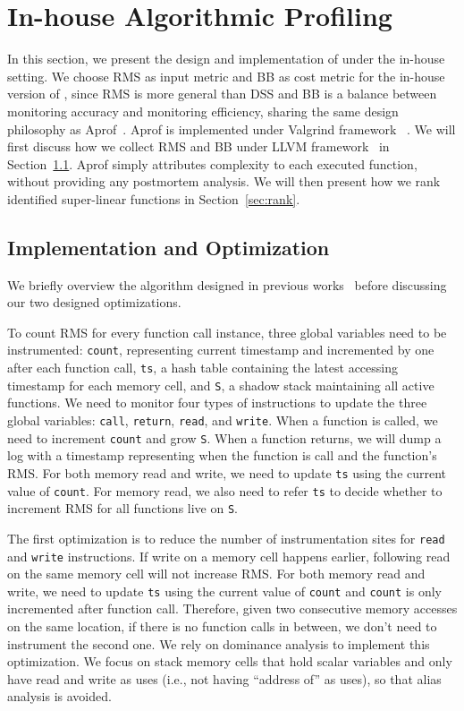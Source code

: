 \section{In-house Algorithmic Profiling}
\label{sec:in-house}

In this section, we present the design and implementation 
of \Tool under the in-house setting. 
We choose RMS as input metric and BB as cost 
metric for the in-house version of \Tool, 
since RMS is more general than DSS and BB is a balance 
between monitoring accuracy and monitoring efficiency, 
sharing the same design philosophy as Aprof~\cite{Aprof1,Aprof2}.
Aprof is implemented under Valgrind framework~\cite{valgrind} .
We will first discuss how we collect RMS and BB under LLVM 
framework~\cite{llvm} in Section~\ref{sec:inhouse_impl}.
Aprof simply attributes complexity to each executed function, 
without providing any postmortem analysis. 
We will then present how we rank identified super-linear 
functions in Section~\ref{sec:rank}. 


\subsection{Implementation and Optimization}
\label{sec:inhouse_impl}

We briefly overview the algorithm 
designed in previous works~\cite{Aprof1,Aprof2} 
before discussing our two designed optimizations. 

To count RMS for every function call instance, 
three global variables need to be instrumented:
\texttt{count}, representing current timestamp 
and incremented by one after each function call,
\texttt{ts}, a hash table containing the latest accessing timestamp 
for each memory cell,
and \texttt{S}, a shadow stack maintaining all active functions. 
We need to monitor four types of instructions to 
update the three global variables:
\texttt{call}, \texttt{return}, \texttt{read}, and \texttt{write}.
When a function is called, 
we need to increment \texttt{count} and grow \texttt{S}.
When a function returns, 
we will dump a log with a timestamp 
representing when the function is call 
and the function's RMS.
For both memory read and write, we need to update \texttt{ts} 
using the current value of \texttt{count}. 
For memory read, we also need to refer \texttt{ts} to decide 
whether to increment RMS for all functions live on \texttt{S}.


The first optimization is to reduce the number of 
instrumentation sites for \texttt{read} and \texttt{write} instructions. 
If write on a memory cell happens earlier, 
following read on the same memory cell will not increase RMS.
For both memory read and write, 
we need to update \texttt{ts} using the current 
value of \texttt{count} and \texttt{count} is only incremented after function call. 
Therefore, given two consecutive memory accesses on the same location,
if there is no function calls in between, 
we don't need to instrument the second one. 
We rely on dominance analysis to implement this optimization. 
We focus on stack memory cells that hold scalar variables 
and only have read and write as uses 
(i.e., not having ``address of'' as uses), 
so that alias analysis is avoided. 

